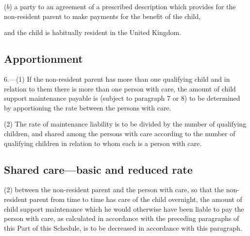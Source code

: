 \documentclass[a4paper]{article}
\begin{document}
{{\begin{enumerate}
($b$) a party to an agreement of a prescribed description which provides for the non-resident parent to make payments for the benefit of the child,
\end{enumerate}
and the child is habitually resident in the United Kingdom.


}

\subsection*{Apportionment}

6.---(1) If the non-resident parent has more than one qualifying child and in relation to them there is more than one person with care, the amount of child support maintenance payable is (subject to paragraph 7 or 8) to be determined by apportioning the rate between the persons with care.

(2) The rate of maintenance liability is to be divided by the number of qualifying children, and shared among the persons with care according to the number of qualifying children in relation to whom each is a person with care.

\subsection*{Shared care---basic and reduced rate}



(2)  between the non-resident parent and the person with care, so that the non-resident parent from time to time has care of the child overnight, the amount of child support maintenance which he would otherwise have been liable to pay the person with care, as calculated in accordance with the preceding paragraphs of this Part of this Schedule, is to be decreased in accordance with this paragraph.

}
\end{document}
